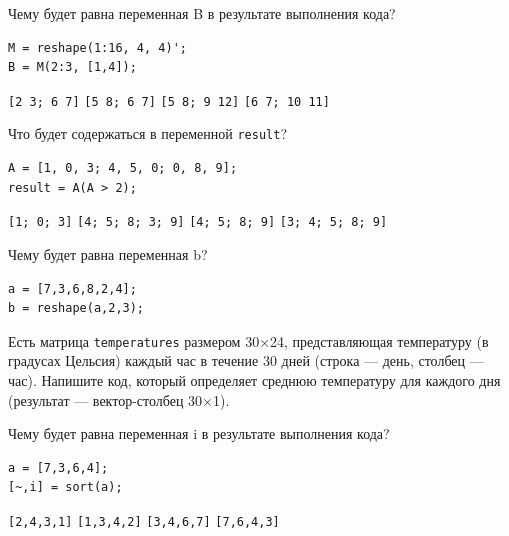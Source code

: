 \documentclass[addpoints,12pt]{exam}
\begin{document}
\vspace{0.3cm}

\begin{questions}
 
\question[1] Чему будет равна переменная B в результате выполнения кода?
\begin{lstlisting}
M = reshape(1:16, 4, 4)';
B = M(2:3, [1,4]);
\end{lstlisting}
\begin{checkboxes}
\choice \texttt{[2 3; 6 7]} 
\choice \texttt{[5 8; 6 7]}
\CorrectChoice \texttt{[5 8; 9 12]}
\choice \texttt{[6 7; 10 11]}
\end{checkboxes}

\question[1] Что будет содержаться в переменной \texttt{result}?
\begin{lstlisting}
A = [1, 0, 3; 4, 5, 0; 0, 8, 9];
result = A(A > 2);
\end{lstlisting}
\begin{checkboxes}
\choice \texttt{[1; 0; 3]}
\CorrectChoice \texttt{[4; 5; 8; 3; 9]}
\choice \texttt{[4; 5; 8; 9]}
\choice \texttt{[3; 4; 5; 8; 9]}
\end{checkboxes}

\question[1] Чему будет равна переменная b?
\begin{lstlisting}
a = [7,3,6,8,2,4];
b = reshape(a,2,3);
\end{lstlisting}
\begin{checkboxes}
\choice  [7, 3, 8; 6, 2, 4]
\CorrectChoice [7, 6, 2; 3, 8, 4]
\choice  [7, 3; 8, 6; 2, 4]
\choice  [7, 6; 2, 3; 8, 4]
\end{checkboxes}

\question[1] Есть матрица \texttt{temperatures} размером 30×24, представляющая температуру (в градусах Цельсия) каждый час в течение 30 дней (строка — день, столбец — час). Напишите код, который определяет среднюю температуру для каждого дня (результат — вектор-столбец 30×1).
\begin{solutionorlines}[2cm]
\end{solutionorlines}
 
\question[1] Чему будет равна переменная i в результате выполнения кода?
\begin{lstlisting}
a = [7,3,6,4];
[~,i] = sort(a);
\end{lstlisting}
\begin{checkboxes}
\CorrectChoice \texttt{[2,4,3,1]}
\choice \texttt{[1,3,4,2]}
\choice \texttt{[3,4,6,7]}
\choice \texttt{[7,6,4,3]}
\end{checkboxes}


\end{questions}
\end{document}
